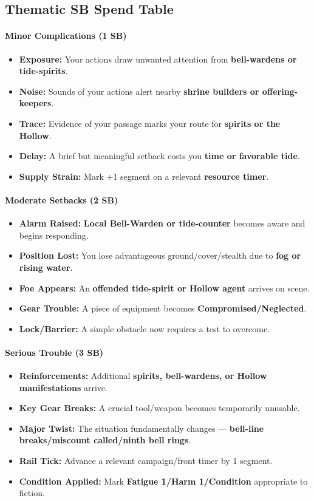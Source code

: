 \subsection*{Thematic SB Spend Table}
\label{sec:aelinnel-sb}

\paragraph{Minor Complications (1 SB)}
\begin{itemize}
\item \textbf{Exposure:} Your actions draw unwanted attention from \textbf{bell-wardens or tide-spirits}.
\item \textbf{Noise:} Sounds of your actions alert nearby \textbf{shrine builders or offering-keepers}.
\item \textbf{Trace:} Evidence of your passage marks your route for \textbf{spirits or the Hollow}.
\item \textbf{Delay:} A brief but meaningful setback costs you \textbf{time or favorable tide}.
\item \textbf{Supply Strain:} Mark +1 segment on a relevant \textbf{resource timer}.
\end{itemize}

\paragraph{Moderate Setbacks (2 SB)}
\begin{itemize}
\item \textbf{Alarm Raised:} \textbf{Local Bell-Warden or tide-counter} becomes aware and begins responding.
\item \textbf{Position Lost:} You lose advantageous ground/cover/stealth due to \textbf{fog or rising water}.
\item \textbf{Foe Appears:} An \textbf{offended tide-spirit or Hollow agent} arrives on scene.
\item \textbf{Gear Trouble:} A piece of equipment becomes \textbf{Compromised/Neglected}.
\item \textbf{Lock/Barrier:} A simple obstacle now requires a test to overcome.
\end{itemize}

\paragraph{Serious Trouble (3 SB)}
\begin{itemize}
\item \textbf{Reinforcements:} Additional \textbf{spirits, bell-wardens, or Hollow manifestations} arrive.
\item \textbf{Key Gear Breaks:} A crucial tool/weapon becomes temporarily unusable.
\item \textbf{Major Twist:} The situation fundamentally changes --- \textbf{bell-line breaks/miscount called/ninth bell rings}.
\item \textbf{Rail Tick:} Advance a relevant campaign/front timer by 1 segment.
\item \textbf{Condition Applied:} Mark \textbf{Fatigue 1/Harm 1/Condition} appropriate to fiction.
\end{itemize}

